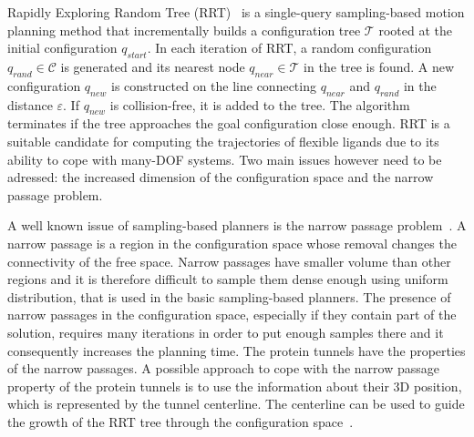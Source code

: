 \documentclass{svmult}
\def\qrand{q_{rand}}
\def\qstart{q_{start}}
\def\qinit{\qstart}
\def\qnear{q_{near}}
\def\qnew{q_{new}}
\def\T{\mathcal{T}}
\def\C{\mathcal{C}}
\begin{document}
Rapidly Exploring Random Tree (RRT)~\cite{lavalleRRT} is a single-query sampling-based motion planning method that 
incrementally builds a configuration tree $\T$ rooted at the initial configuration $\qinit$.
In each iteration of RRT, a random configuration $\qrand \in \C$ is generated and its nearest node $\qnear \in \T$ in the tree is found.
A new configuration $\qnew$ is constructed on the line connecting $\qnear$ and $\qrand$ in the distance $\varepsilon$.
If $\qnew$ is collision-free, it is added to the tree.
The algorithm terminates if the tree approaches the goal configuration close enough.
RRT is a suitable candidate for computing the trajectories of flexible ligands due to its ability to cope
with many-DOF systems.
Two main issues however need to be adressed: the increased dimension of the configuration space and the narrow passage problem.



A well known issue of sampling-based planners is the narrow passage problem~\cite{hannaWIS}.
A narrow passage is a region in the configuration space whose removal changes the connectivity of the free space.
Narrow passages have smaller volume than other regions and it is therefore difficult to sample them dense enough using uniform distribution, that is used in the basic sampling-based planners.
The presence of narrow passages in the configuration space, especially if they contain part of the solution, requires many iterations
in order to put enough samples there and it consequently increases the planning time.
The protein tunnels have the properties of the narrow passages. 
A possible approach to cope with the narrow passage property of the protein tunnels is to use the information
about their 3D position, which is represented by the tunnel centerline.
The centerline can be used to guide the growth of the RRT tree through the configuration space~\cite{vonasek2009rrt,denny2016dynamic}.
\end{document}
